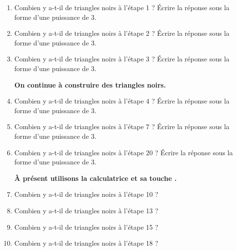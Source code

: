 \begin{changemargin}{-10mm}{-10mm}
\begin{activite}
    \begin{enumerate}
        \item Combien y a-t-il de triangles noirs à l'étape 1 ? Écrire la réponse sous la forme d'une puissance de \num{3}.
        \item Combien y a-t-il de triangles noirs à l'étape 2 ? Écrire la réponse sous la forme d'une puissance de \num{3}.
        \item Combien y a-t-il de triangles noirs à l'étape 3 ? Écrire la réponse sous la forme d'une puissance de \num{3}.
        
        {\bfseries On continue à construire des triangles noirs.}
        \item Combien y a-t-il de triangles noirs à l'étape 4 ? Écrire la réponse sous la forme d'une puissance de \num{3}.
        \item Combien y a-t-il de triangles noirs à l'étape 7 ? Écrire la réponse sous la forme d'une puissance de \num{3}.
        \item Combien y a-t-il de triangles noirs à l'étape 20 ? Écrire la réponse sous la forme d'une puissance de \num{3}.
        
        {\bfseries À présent utilisons la calculatrice et sa touche .}
        \item Combien y a-t-il de triangles noirs à l'étape 10 ?
        \item Combien y a-t-il de triangles noirs à l'étape 13 ?
        \item Combien y a-t-il de triangles noirs à l'étape 15 ?
        \item Combien y a-t-il de triangles noirs à l'étape 18 ?
    \end{enumerate}

    \begin{center}
     \end{center}
\end{activite}
\end{changemargin}